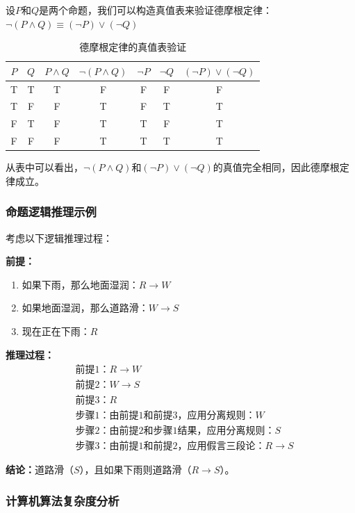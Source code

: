 \documentclass{article}
\begin{document}
设$P$和$Q$是两个命题，我们可以构造真值表来验证德摩根定律：$\neg(P \land Q) \equiv (\neg P) \lor (\neg Q)$

\begin{table}[h]
\centering
\begin{tabular}{|c|c|c|c|c|c|c|}
\hline
$P$ & $Q$ & $P \land Q$ & $\neg(P \land Q)$ & $\neg P$ & $\neg Q$ & $(\neg P) \lor (\neg Q)$ \\
\hline
T & T & T & F & F & F & F \\
T & F & F & T & F & T & T \\
F & T & F & T & T & F & T \\
F & F & F & T & T & T & T \\
\hline
\end{tabular}
\caption{德摩根定律的真值表验证}
\end{table}

从表中可以看出，$\neg(P \land Q)$和$(\neg P) \lor (\neg Q)$的真值完全相同，因此德摩根定律成立。

\subsubsection{命题逻辑推理示例}

考虑以下逻辑推理过程：

\textbf{前提：}
\begin{enumerate}
\item 如果下雨，那么地面湿润：$R \rightarrow W$
\item 如果地面湿润，那么道路滑：$W \rightarrow S$
\item 现在正在下雨：$R$
\end{enumerate}

\textbf{推理过程：}
\begin{align}
&\text{前提1：} R \rightarrow W \\
&\text{前提2：} W \rightarrow S \\
&\text{前提3：} R \\
&\text{步骤1：由前提1和前提3，应用分离规则：} W \\
&\text{步骤2：由前提2和步骤1结果，应用分离规则：} S \\
&\text{步骤3：由前提1和前提2，应用假言三段论：} R \rightarrow S
\end{align}

\textbf{结论：}道路滑（$S$），且如果下雨则道路滑（$R \rightarrow S$）。

\subsubsection{计算机算法复杂度分析}
\end{document}
